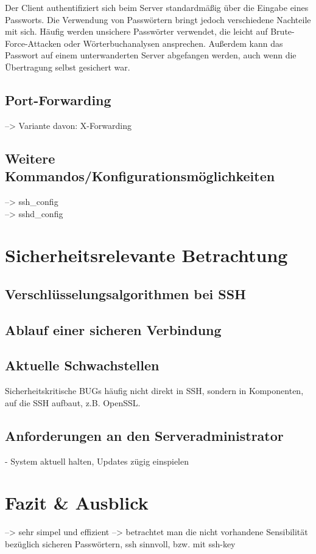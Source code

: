 \documentclass[ngerman,pdf]{wkcms}    %
\begin{document}
Der Client authentifiziert sich beim Server standardmäßig über die Eingabe eines Passworts. Die Verwendung von Passwörtern bringt jedoch verschiedene Nachteile mit sich. Häufig werden unsichere Passwörter verwendet, die leicht auf Brute-Force-Attacken oder Wörterbuchanalysen ansprechen. Außerdem kann das Passwort auf einem unterwanderten Server abgefangen werden, auch wenn die Übertragung selbst gesichert war. \cite[S. 29]{SSH} 

\subsection{Port-Forwarding}
--> Variante davon: X-Forwarding
\subsection{Weitere Kommandos/Konfigurationsmöglichkeiten}
--> ssh\_config \\
--> sshd\_config \\



\section{Sicherheitsrelevante Betrachtung}




\subsection{Verschlüsselungsalgorithmen bei SSH}
\subsection{Ablauf einer sicheren Verbindung}\label{sec:ablauf}
\subsection{Aktuelle Schwachstellen}
Sicherheitskritische BUGs häufig nicht direkt in SSH, sondern in Komponenten, auf die SSH aufbaut, z.B. OpenSSL.

\subsection{Anforderungen an den Serveradministrator}
- System aktuell halten, Updates zügig einspielen


\newpage


\section{Fazit \& Ausblick}
--> sehr simpel und effizient
--> betrachtet man die nicht vorhandene Sensibilität bezüglich sicheren Passwörtern, ssh sinnvoll, bzw. mit ssh-key




\end{document}
